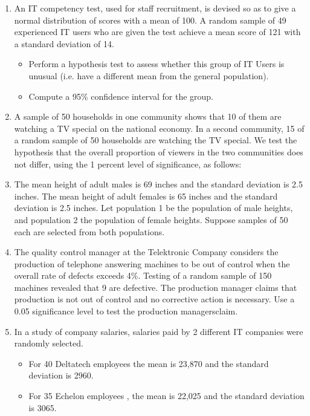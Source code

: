 \documentclass[a4paper,12pt]{article}
\begin{document}
 \begin{enumerate}
 \item  An IT competency test, used for staff recruitment, is devised so as to give a normal distribution of scores with a mean of 100. A random sample of 49 experienced IT users  who are given the test achieve a mean score of 121 with a standard deviation of 14.
 \begin{itemize}
  \item  Perform a hypothesis test to assess whether this group of IT Users is unusual (i.e. have a different mean from the general population).
  \item  Compute a 95\% confidence interval for the group.
 \end{itemize}
 
\item 
 A sample of 50 households in one community
 shows that 10 of them are watching a TV special on the national
 economy. In a second community, 15 of a random sample of 50
 households are watching the TV special. We test the hypothesis
 that the overall proportion of viewers in the two communities does
 not differ, using the 1 percent level of significance, as follows:
 
 
\item 
 The mean height of adult males is 69 inches and the standard
 deviation is 2.5 inches. The mean height of adult females is 65
 inches and the standard deviation is 2.5 inches. Let population 1
 be the population of male heights, and population 2 the population
 of female heights. Suppose samples of 50 each are selected from
 both populations.
 
 
 \item The quality control manager at the Telektronic Company considers the production of telephone answering machines to be out of control when the overall rate of defects exceeds 4\%.
 Testing of a random sample of 150 machines revealed that 9 are defective. The production manager claims that production is not out of control and no corrective action is necessary. Use a 0.05 significance level to test the production managersclaim.
 
 \item In a study of company salaries, salaries paid by 2 different IT companies were randomly selected.
 
 \begin{itemize}
 \item For 40 Deltatech employees the mean is 23,870 and the standard deviation is 2960.
 \item For 35 Echelon employees , the mean is 22,025 and the standard deviation is 3065.
 \end{itemize}
 

\end{enumerate}
\end{document}
